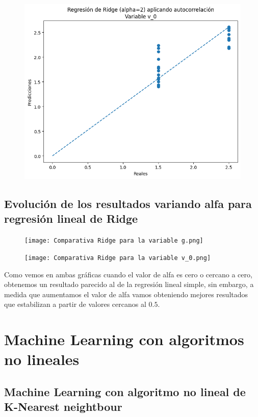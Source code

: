 \documentclass[oneside,openright,titlepage,numbers=noenddot,openany,headinclude,footinclude=true,
cleardoublepage=empty,abstractoff,BCOR=5mm,paper=a4,fontsize=12pt,main=spanish]{scrreprt}
\begin{document}
\begin{figure}[H]
	\centering
	\includegraphics[width=12cm]{Regresión de Ridge (alpha=2) aplicando autocorrelación Variable v_0.png}
\end{figure}

\subsection{Evolución de los resultados variando alfa para regresión lineal de Ridge}

\begin{figure}[H]
	\centering
	\texttt{[image: Comparativa Ridge para la variable g.png]}
\end{figure}

\begin{figure}[H]
	\centering
	\texttt{[image: Comparativa Ridge para la variable v\_0.png]}
\end{figure}

Como vemos en ambas gráficas cuando el valor de alfa es cero o cercano a cero, obtenemos un resultado parecido al de la regresión lineal simple, sin embargo, a medida que aumentamos el valor de alfa vamos obteniendo mejores resultados que estabilizan a partir de valores cercanos al $0.5$.

\section{Machine Learning con algoritmos no lineales}

\subsection{Machine Learning con algoritmo no lineal de K-Nearest neightbour}
\end{document}
